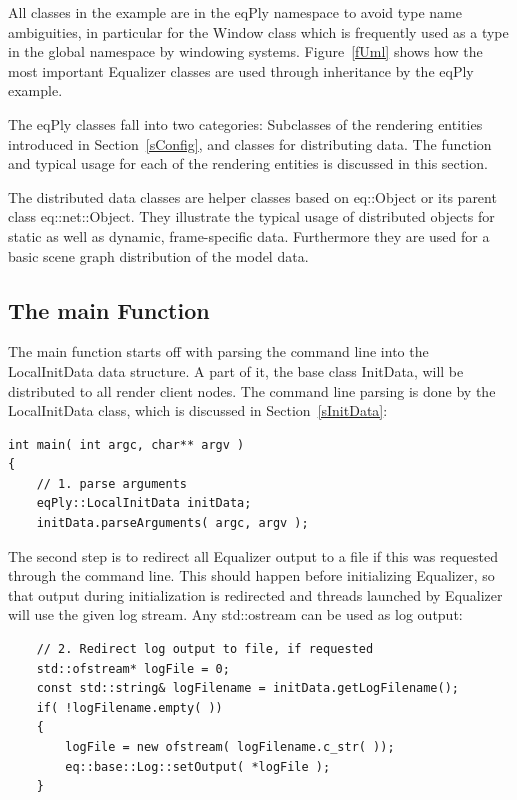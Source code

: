 \documentclass[10pt,a4]{scrartcl}
\newcommand{\fig}[1]{Figure~\ref{#1}}
\newcommand{\sref}[1]{Section~\ref{#1}}
\begin{document}
All classes in the example are in the \textsf{eqPly} namespace to avoid
type name ambiguities, in particular for the \textsf{Window} class which
is frequently used as a type in the global namespace by windowing
systems. \fig{fUml} shows how the most important Equalizer classes are
used through inheritance by the \textsf{eqPly} example.

The \textsf{eqPly} classes fall into two categories: Subclasses of the
rendering entities introduced in \sref{sConfig}, and classes for
distributing data. The function and typical usage for each of the
rendering entities is discussed in this section.

The distributed data classes are helper classes based on
\textsf{eq::Object} or its parent class \textsf{eq::net::Object}. They
illustrate the typical usage of distributed objects for static as well
as dynamic, frame-specific data. Furthermore they are used for a basic
scene graph distribution of the model data.


\subsection{The main Function}

The main function starts off with parsing the command line into the
\textsf{LocalInitData} data structure. A part of it, the base class
\textsf{InitData}, will be distributed to all render client nodes. The
command line parsing is done by the \textsf{LocalInitData} class, which
is discussed in \sref{sInitData}:

{\footnotesize\begin{lstlisting}
int main( int argc, char** argv )
{
    // 1. parse arguments
    eqPly::LocalInitData initData;
    initData.parseArguments( argc, argv );
\end{lstlisting}}

The second step is to redirect all Equalizer output to a file if this
was requested through the command line. This should happen before
initializing Equalizer, so that output during initialization is
redirected and threads launched by Equalizer will use the given log
stream. Any \textsf{std::ostream} can be used as log output:

{\footnotesize\begin{lstlisting}
    // 2. Redirect log output to file, if requested
    std::ofstream* logFile = 0;
    const std::string& logFilename = initData.getLogFilename();
    if( !logFilename.empty( ))
    {
        logFile = new ofstream( logFilename.c_str( ));
        eq::base::Log::setOutput( *logFile );
    }
\end{lstlisting}}
\end{document}
